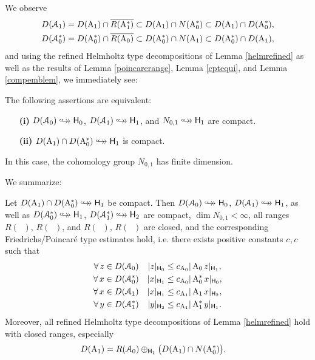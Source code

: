 \documentclass[a4paper]{amsart}
\renewcommand{\H}{\mathsf{H}}
\DeclareMathOperator{\Az}{A_{0}}
\DeclareMathOperator{\Azs}{A_{0}^{*}}
\DeclareMathOperator{\cAz}{\mathcal{A}_{0}}
\DeclareMathOperator{\cAzs}{\mathcal{A}_{0}^{*}}
\DeclareMathOperator{\Ao}{A_{1}}
\DeclareMathOperator{\Aos}{A_{1}^{*}}
\DeclareMathOperator{\cAo}{\mathcal{A}_{1}}
\DeclareMathOperator{\cAos}{\mathcal{A}_{1}^{*}}
\newcommand{\cptemb}{\hookto\hspace*{-0.85em}\hookto}
\begin{document}
We observe
\begin{align*}
D(\cAo)
&=D(\Ao)\cap\ovl{R(\Aos)}
\subset D(\Ao)\cap N(\Azs)
\subset D(\Ao)\cap D(\Azs),\\
D(\cAzs)
&=D(\Azs)\cap\ovl{R(\Az)}
\subset D(\Azs)\cap N(\Ao)
\subset D(\Azs)\cap D(\Ao),
\end{align*}
and using the refined Helmholtz type decompositions of Lemma \ref{helmrefined}
as well as the results of Lemma \ref{poincarerange}, Lemma \ref{cptequi}, and Lemma \ref{compemblem},
we immediately see: 

\begin{lem}
\label{compemblem}
The following assertions are equivalent: 
\begin{itemize}
\item[\bf(i)]
$D(\cAz)\cptemb\H_{0}$, $D(\cAo)\cptemb\H_{1}$,
and $N_{0,1}\cptemb\H_{1}$ are compact.
\item[\bf(ii)]
$D(\Ao)\cap D(\Azs)\cptemb\H_{1}$ is compact.
\end{itemize}
In this case, the cohomology group $N_{0,1}$ has finite dimension.
\end{lem}

We summarize:

\begin{theo}
\label{compembtheo}
Let $D(\Ao)\cap D(\Azs)\cptemb\H_{1}$ be compact.
Then $D(\cAz)\cptemb\H_{0}$, $D(\cAo)\cptemb\H_{1}$,
as well as $D(\cAzs)\cptemb\H_{1}$, $D(\cAos)\cptemb\H_{2}$ are compact,
$\dim N_{0,1}<\infty$,
all ranges $R(\Az)$, $R(\Azs)$, and $R(\Ao)$, $R(\Aos)$ are closed, and
the corresponding Friedrichs/Poincar\'e type estimates hold, i.e.
there exists positive constants $c_{\Az},c_{\Ao}$ such that
\begin{align}
\mylabel{poincareAz}
\forall\,z&\in D(\cAz)
&
\norm{z}_{\H_{0}}&\leq c_{\Az}\norm{\Az z}_{\H_{1}},\\
\nonumber
\forall\,x&\in D(\cAzs)
&
\norm{x}_{\H_{1}}&\leq c_{\Az}\norm{\Azs x}_{\H_{0}},\\
\nonumber
\forall\,x&\in D(\cAo)
&
\norm{x}_{\H_{1}}&\leq c_{\Ao}\norm{\Ao x}_{\H_{2}},\\
\nonumber
\forall\,y&\in D(\cAos)
&
\norm{y}_{\H_{2}}&\leq c_{\Ao}\norm{\Aos y}_{\H_{1}}.
\end{align}
Moreover, all refined Helmholtz type decompositions of Lemma \ref{helmrefined} 
hold with closed ranges, especially
\begin{align}
\mylabel{helmrefinedimportant}
D(\Ao)&=R(\cAz)\oplus_{\H_{1}}\big(D(\Ao)\cap N(\Azs)\big).
\end{align}
\end{theo}
\end{document}
